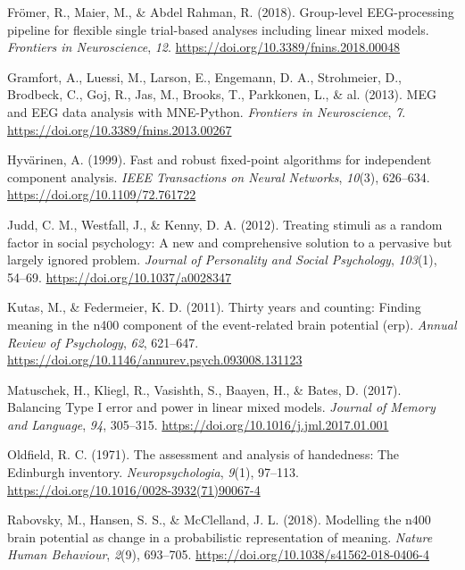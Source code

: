 \documentclass[
  english,
  man,11pt,floatsintext]{apa7}
\newlength{\cslhangindent}
\newenvironment{cslreferences}%
  {\setlength{\parindent}{0pt}%
  \everypar{\setlength{\hangindent}{\cslhangindent}}\ignorespaces}%
  {\par}
\begin{document}
\begin{cslreferences}
\leavevmode\hypertarget{ref-fruxf6mer2018}{}%
Frömer, R., Maier, M., \& Abdel Rahman, R. (2018). Group-level EEG-processing pipeline for flexible single trial-based analyses including linear mixed models. \emph{Frontiers in Neuroscience}, \emph{12}. \url{https://doi.org/10.3389/fnins.2018.00048}

\leavevmode\hypertarget{ref-gramfort2013}{}%
Gramfort, A., Luessi, M., Larson, E., Engemann, D. A., Strohmeier, D., Brodbeck, C., Goj, R., Jas, M., Brooks, T., Parkkonen, L., \& al. (2013). MEG and EEG data analysis with MNE-Python. \emph{Frontiers in Neuroscience}, \emph{7}. \url{https://doi.org/10.3389/fnins.2013.00267}

\leavevmode\hypertarget{ref-hyvuxe4rinen1999}{}%
Hyvärinen, A. (1999). Fast and robust fixed-point algorithms for independent component analysis. \emph{IEEE Transactions on Neural Networks}, \emph{10}(3), 626--634. \url{https://doi.org/10.1109/72.761722}

\leavevmode\hypertarget{ref-judd2012}{}%
Judd, C. M., Westfall, J., \& Kenny, D. A. (2012). Treating stimuli as a random factor in social psychology: A new and comprehensive solution to a pervasive but largely ignored problem. \emph{Journal of Personality and Social Psychology}, \emph{103}(1), 54--69. \url{https://doi.org/10.1037/a0028347}

\leavevmode\hypertarget{ref-kutas2011}{}%
Kutas, M., \& Federmeier, K. D. (2011). Thirty years and counting: Finding meaning in the n400 component of the event-related brain potential (erp). \emph{Annual Review of Psychology}, \emph{62}, 621--647. \url{https://doi.org/10.1146/annurev.psych.093008.131123}

\leavevmode\hypertarget{ref-matuschek2017}{}%
Matuschek, H., Kliegl, R., Vasishth, S., Baayen, H., \& Bates, D. (2017). Balancing Type I error and power in linear mixed models. \emph{Journal of Memory and Language}, \emph{94}, 305--315. \url{https://doi.org/10.1016/j.jml.2017.01.001}

\leavevmode\hypertarget{ref-oldfield1971}{}%
Oldfield, R. C. (1971). The assessment and analysis of handedness: The Edinburgh inventory. \emph{Neuropsychologia}, \emph{9}(1), 97--113. \url{https://doi.org/10.1016/0028-3932(71)90067-4}

\leavevmode\hypertarget{ref-rabovsky2018}{}%
Rabovsky, M., Hansen, S. S., \& McClelland, J. L. (2018). Modelling the n400 brain potential as change in a probabilistic representation of meaning. \emph{Nature Human Behaviour}, \emph{2}(9), 693--705. \url{https://doi.org/10.1038/s41562-018-0406-4}


\end{cslreferences}
\end{document}
